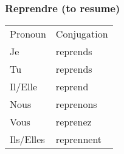 \subsubsection{Reprendre (to resume)}
\begin{tabular}{| l | l |}
\hline
Pronoun 	& Conjugation	\\
Je		    &  reprends \\
Tu		    &  reprends \\
Il/Elle		&  reprend \\
Nous		&  reprenons  \\
Vous		&  reprenez \\
Ils/Elles	&  reprennent \\
\hline
\end{tabular}

